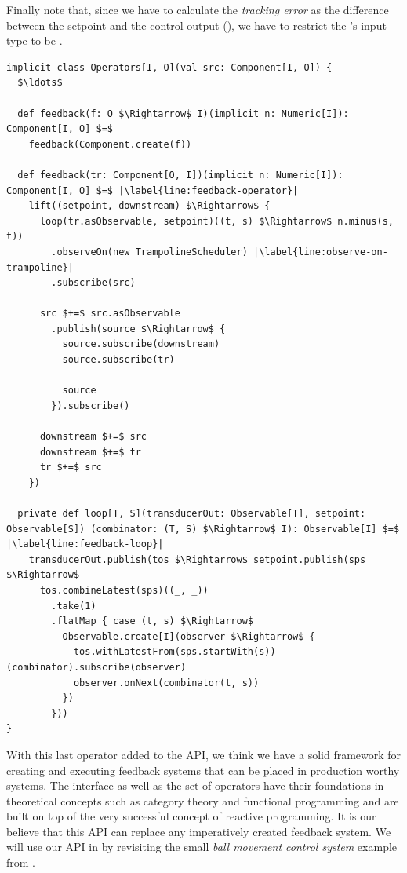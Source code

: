 Finally note that, since we have to calculate the \textit{tracking error} as the difference between the setpoint and the control output (), we have to restrict the \comp's input type to be .

\begin{minipage}{\linewidth}
\begin{lstlisting}[style=ScalaStyle, caption={Feedback operator}, label={lst:feedback-operator}]
implicit class Operators[I, O](val src: Component[I, O]) {
  $\ldots$

  def feedback(f: O $\Rightarrow$ I)(implicit n: Numeric[I]): Component[I, O] $=$
    feedback(Component.create(f))

  def feedback(tr: Component[O, I])(implicit n: Numeric[I]): Component[I, O] $=$ |\label{line:feedback-operator}|
    lift((setpoint, downstream) $\Rightarrow$ {
      loop(tr.asObservable, setpoint)((t, s) $\Rightarrow$ n.minus(s, t))
        .observeOn(new TrampolineScheduler) |\label{line:observe-on-trampoline}|
        .subscribe(src)

      src $+=$ src.asObservable
        .publish(source $\Rightarrow$ {
          source.subscribe(downstream)
          source.subscribe(tr)

          source
        }).subscribe()

      downstream $+=$ src
      downstream $+=$ tr
      tr $+=$ src
    })
  
  private def loop[T, S](transducerOut: Observable[T], setpoint: Observable[S]) (combinator: (T, S) $\Rightarrow$ I): Observable[I] $=$ |\label{line:feedback-loop}|
    transducerOut.publish(tos $\Rightarrow$ setpoint.publish(sps $\Rightarrow$
      tos.combineLatest(sps)((_, _))
        .take(1)
        .flatMap { case (t, s) $\Rightarrow$
          Observable.create[I](observer $\Rightarrow$ {
            tos.withLatestFrom(sps.startWith(s))(combinator).subscribe(observer)
            observer.onNext(combinator(t, s))
          })
        }))
}
\end{lstlisting}
\end{minipage}

With this last operator added to the API, we think we have a solid framework for creating and executing feedback systems that can be placed in production worthy systems. The interface as well as the set of operators have their foundations in theoretical concepts such as category theory and functional programming and are built on top of the very successful concept of reactive programming. It is our believe that this API can replace any imperatively created feedback system. We will use our API in  by revisiting the small \textit{ball movement control system} example from .